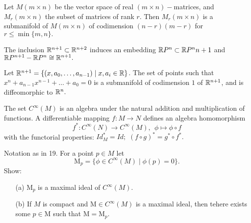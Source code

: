 \begin{problem}{16}
Let $M(m \times n)$ be the vector space of real $(m\times n)-$matrices, and $M_r(m \times n)$ the subset of matrices of rank $r$. Then $M_r(m \times n)$ is a submanifold of $M(m \times n)$ of codimension $(n-r)(m-r)$ for $r \leq \min \{m,n\}.$
\end{problem}


\begin{problem}{17}
The inclusion $\mathbb{R}^{n+1} \subset \mathbb{R}^{n+2}$ induces an embedding $\mathbb{R} P^n \subset \mathbb{R} P^n{n+1}$ and $\mathbb{R} P^{n+1} - \mathbb{R} P^{n} \cong \mathbb{R}^{n+1}.$
\end{problem}


\begin{problem}{18}
Let $\mathbb{R}^{n+1} = \{(x, a_0, \ldots, a_{n-1}) \mid x, a_i \in \mathbb{R} \}$. The set of points such that $x^n + a_{n-1}x^{n-1}+ \ldots + a_0 = 0$ is a submanifold of codimension $1$ of $\mathbb{R}^{n+1}$, and is diffeomorphic to $\mathbb{R}^n.$
\end{problem}


\begin{problem}{19}
The set $C^\infty(M)$ is an algebra under the natural addition and multiplication of functions. A differentiable mapping $f: M \rightarrow N$ defines an algebra homomorphism
$$
f^\ast: C^\infty(N) \rightarrow C^\infty(M), \ \ \phi \mapsto \phi \circ f
$$
with the functorial properties: $Id^\ast_M = Id;$ $(f \circ g)^\ast = g^\ast \circ f^\ast.$
\end{problem}

\begin{problem}{20}
Notation as in 19. For a point $p\in M$ let 
$$
\mathrm{M}_p = \{\phi \in C^\infty(M) \mid \phi(p) = 0 \}.
$$
Show:
\begin{itemize}
\item[(a)] $\mathrm{M}_p$ is a maximal ideal of $C^\infty(M).$
\item[(b)] If $M$ is compact and $\mathrm{M} \in C^\infty(M)$ is a maximal ideal, then tehere exists some $p \in \mathrm{M}$ such that $\mathrm{M} = \mathrm{M}_p.$
\end{itemize}
\end{problem}
